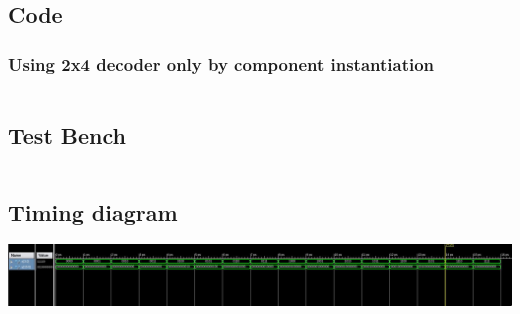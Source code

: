 \documentclass[titlepage]{article}
\begin{document}
    \subsection{Code}
    \subsubsection{Using 2x4 decoder only by component instantiation}
    \inputminted{vhdl}{./codes/a3_4.vhd}
    \subsection{Test Bench}
    \inputminted{vhdl}{./codes/tb_a3_4.vhd}
    \subsection{Timing diagram}
    \includegraphics[width=19cm]{./figures/td_4x16.jpeg}
\end{document}

